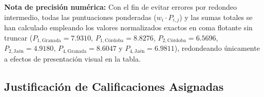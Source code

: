 \documentclass{report}
\begin{document}
\begin{table}[H]
{\begin{tabular}{l c cc cc cc}
            \bottomrule
        \end{tabular}%
    }
    \vspace{0.18cm}
    \parbox{\textwidth}{\footnotesize \textbf{Nota de precisión numérica:} Con el fin de evitar errores por redondeo intermedio, todas las puntuaciones ponderadas ($w_i \cdot P_{i,j}$) y las sumas totales se han calculado empleando los valores normalizados exactos en coma flotante sin truncar ($P_{1,\text{Granada}} = \num{7.9310}$, $P_{1,\text{Córdoba}} = \num{8.8276}$, $P_{2,\text{Córdoba}} = \num{6.5696}$, $P_{2,\text{Jaén}} = \num{4.9180}$, $P_{4,\text{Granada}} = \num{8.6047}$ y $P_{4,\text{Jaén}} = \num{6.9811}$), redondeando únicamente a efectos de presentación visual en la tabla.}
\end{table}

\subsection{Justificación de Calificaciones Asignadas}
\end{document}

